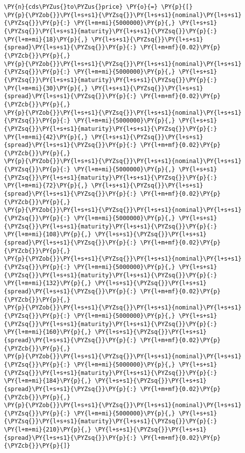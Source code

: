 \begin{Answer}
\begin{tcolorbox}[size=fbox, boxrule=1pt,colback=cellbackground, colframe=cellborder]
\begin{Verbatim}[commandchars=\\\{\}]
\PY{n}{cds\PYZus{}to\PYZus{}price} \PY{o}{=} \PY{p}{[}
\PY{p}{\PYZob{}}\PY{l+s+s1}{\PYZsq{}}\PY{l+s+s1}{nominal}\PY{l+s+s1}{\PYZsq{}}\PY{p}{:} \PY{l+m+mi}{5000000}\PY{p}{,} \PY{l+s+s1}{\PYZsq{}}\PY{l+s+s1}{maturity}\PY{l+s+s1}{\PYZsq{}}\PY{p}{:} \PY{l+m+mi}{18}\PY{p}{,} \PY{l+s+s1}{\PYZsq{}}\PY{l+s+s1}{spread}\PY{l+s+s1}{\PYZsq{}}\PY{p}{:} \PY{l+m+mf}{0.02}\PY{p}{\PYZcb{}}\PY{p}{,}
\PY{p}{\PYZob{}}\PY{l+s+s1}{\PYZsq{}}\PY{l+s+s1}{nominal}\PY{l+s+s1}{\PYZsq{}}\PY{p}{:} \PY{l+m+mi}{5000000}\PY{p}{,} \PY{l+s+s1}{\PYZsq{}}\PY{l+s+s1}{maturity}\PY{l+s+s1}{\PYZsq{}}\PY{p}{:} \PY{l+m+mi}{30}\PY{p}{,} \PY{l+s+s1}{\PYZsq{}}\PY{l+s+s1}{spread}\PY{l+s+s1}{\PYZsq{}}\PY{p}{:} \PY{l+m+mf}{0.02}\PY{p}{\PYZcb{}}\PY{p}{,}
\PY{p}{\PYZob{}}\PY{l+s+s1}{\PYZsq{}}\PY{l+s+s1}{nominal}\PY{l+s+s1}{\PYZsq{}}\PY{p}{:} \PY{l+m+mi}{5000000}\PY{p}{,} \PY{l+s+s1}{\PYZsq{}}\PY{l+s+s1}{maturity}\PY{l+s+s1}{\PYZsq{}}\PY{p}{:} \PY{l+m+mi}{42}\PY{p}{,} \PY{l+s+s1}{\PYZsq{}}\PY{l+s+s1}{spread}\PY{l+s+s1}{\PYZsq{}}\PY{p}{:} \PY{l+m+mf}{0.02}\PY{p}{\PYZcb{}}\PY{p}{,}
\PY{p}{\PYZob{}}\PY{l+s+s1}{\PYZsq{}}\PY{l+s+s1}{nominal}\PY{l+s+s1}{\PYZsq{}}\PY{p}{:} \PY{l+m+mi}{5000000}\PY{p}{,} \PY{l+s+s1}{\PYZsq{}}\PY{l+s+s1}{maturity}\PY{l+s+s1}{\PYZsq{}}\PY{p}{:} \PY{l+m+mi}{72}\PY{p}{,} \PY{l+s+s1}{\PYZsq{}}\PY{l+s+s1}{spread}\PY{l+s+s1}{\PYZsq{}}\PY{p}{:} \PY{l+m+mf}{0.02}\PY{p}{\PYZcb{}}\PY{p}{,}
\PY{p}{\PYZob{}}\PY{l+s+s1}{\PYZsq{}}\PY{l+s+s1}{nominal}\PY{l+s+s1}{\PYZsq{}}\PY{p}{:} \PY{l+m+mi}{5000000}\PY{p}{,} \PY{l+s+s1}{\PYZsq{}}\PY{l+s+s1}{maturity}\PY{l+s+s1}{\PYZsq{}}\PY{p}{:} \PY{l+m+mi}{108}\PY{p}{,} \PY{l+s+s1}{\PYZsq{}}\PY{l+s+s1}{spread}\PY{l+s+s1}{\PYZsq{}}\PY{p}{:} \PY{l+m+mf}{0.02}\PY{p}{\PYZcb{}}\PY{p}{,}
\PY{p}{\PYZob{}}\PY{l+s+s1}{\PYZsq{}}\PY{l+s+s1}{nominal}\PY{l+s+s1}{\PYZsq{}}\PY{p}{:} \PY{l+m+mi}{5000000}\PY{p}{,} \PY{l+s+s1}{\PYZsq{}}\PY{l+s+s1}{maturity}\PY{l+s+s1}{\PYZsq{}}\PY{p}{:} \PY{l+m+mi}{132}\PY{p}{,} \PY{l+s+s1}{\PYZsq{}}\PY{l+s+s1}{spread}\PY{l+s+s1}{\PYZsq{}}\PY{p}{:} \PY{l+m+mf}{0.02}\PY{p}{\PYZcb{}}\PY{p}{,}
\PY{p}{\PYZob{}}\PY{l+s+s1}{\PYZsq{}}\PY{l+s+s1}{nominal}\PY{l+s+s1}{\PYZsq{}}\PY{p}{:} \PY{l+m+mi}{5000000}\PY{p}{,} \PY{l+s+s1}{\PYZsq{}}\PY{l+s+s1}{maturity}\PY{l+s+s1}{\PYZsq{}}\PY{p}{:} \PY{l+m+mi}{160}\PY{p}{,} \PY{l+s+s1}{\PYZsq{}}\PY{l+s+s1}{spread}\PY{l+s+s1}{\PYZsq{}}\PY{p}{:} \PY{l+m+mf}{0.02}\PY{p}{\PYZcb{}}\PY{p}{,}
\PY{p}{\PYZob{}}\PY{l+s+s1}{\PYZsq{}}\PY{l+s+s1}{nominal}\PY{l+s+s1}{\PYZsq{}}\PY{p}{:} \PY{l+m+mi}{5000000}\PY{p}{,} \PY{l+s+s1}{\PYZsq{}}\PY{l+s+s1}{maturity}\PY{l+s+s1}{\PYZsq{}}\PY{p}{:} \PY{l+m+mi}{184}\PY{p}{,} \PY{l+s+s1}{\PYZsq{}}\PY{l+s+s1}{spread}\PY{l+s+s1}{\PYZsq{}}\PY{p}{:} \PY{l+m+mf}{0.02}\PY{p}{\PYZcb{}}\PY{p}{,}
\PY{p}{\PYZob{}}\PY{l+s+s1}{\PYZsq{}}\PY{l+s+s1}{nominal}\PY{l+s+s1}{\PYZsq{}}\PY{p}{:} \PY{l+m+mi}{5000000}\PY{p}{,} \PY{l+s+s1}{\PYZsq{}}\PY{l+s+s1}{maturity}\PY{l+s+s1}{\PYZsq{}}\PY{p}{:} \PY{l+m+mi}{210}\PY{p}{,} \PY{l+s+s1}{\PYZsq{}}\PY{l+s+s1}{spread}\PY{l+s+s1}{\PYZsq{}}\PY{p}{:} \PY{l+m+mf}{0.02}\PY{p}{\PYZcb{}}\PY{p}{]}


\end{Verbatim}
\end{tcolorbox}
\end{Answer}
